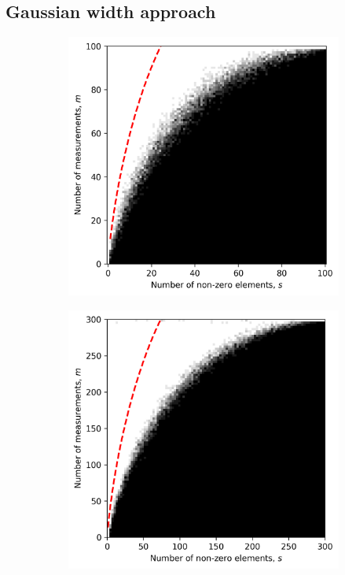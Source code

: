 \subsection{Gaussian width approach}

\begin{figure}
    \begin{subfigure}{0.5\linewidth}
        \includegraphics[width=\linewidth]{pictures/log_estimate.png}
        \caption{}
    \end{subfigure}
    \begin{subfigure}{0.5\linewidth}
        \includegraphics[width=\linewidth]{pictures/log_estimate300.png}
        \caption{}
    \end{subfigure}
    \caption{}
    \label{fig:log}
\end{figure}

